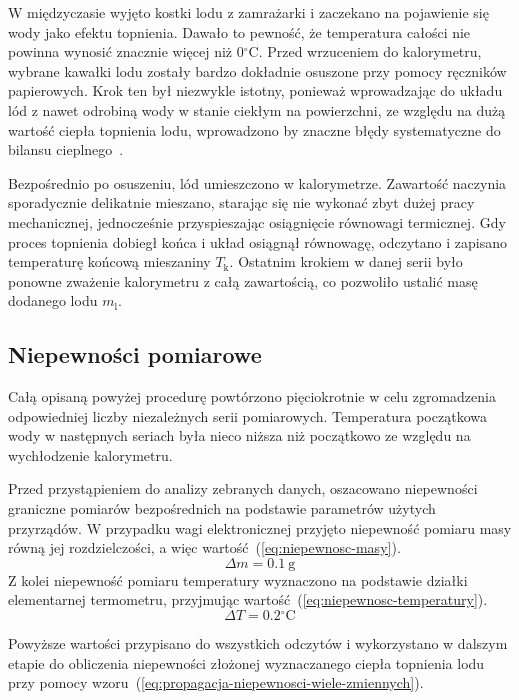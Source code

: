 \documentclass[twocolumn, a4paper, polish, 10pt]{article}
\newcommand{\Tk}{\ensuremath{ T_{\mathrm{k}} }}
\newcommand{\mL}{\ensuremath{ m_{\mathrm{l}} }}
\newcommand{\degCel}{\ensuremath{ \mathrm{^{\circ}C} }}
\begin{document}
W międzyczasie wyjęto kostki lodu z zamrażarki i zaczekano na pojawienie się wody jako efektu topnienia.
Dawało to pewność, że temperatura całości nie powinna wynosić znacznie więcej niż $0\degCel$.
Przed wrzuceniem do kalorymetru, wybrane kawałki lodu zostały bardzo dokładnie osuszone przy pomocy ręczników papierowych.
Krok ten był niezwykle istotny, ponieważ wprowadzając do układu lód z nawet odrobiną wody w stanie ciekłym na powierzchni, ze względu na dużą wartość ciepła topnienia lodu, wprowadzono by znaczne błędy systematyczne do bilansu cieplnego~\cite{pracownia-fizyczna-c4}.

Bezpośrednio po osuszeniu, lód umieszczono w kalorymetrze. Zawartość naczynia sporadycznie delikatnie mieszano, starając się nie wykonać zbyt dużej pracy mechanicznej, jednocześnie przyspieszając osiągnięcie równowagi termicznej.
Gdy proces topnienia dobiegł końca i układ osiągnął równowagę, odczytano i zapisano temperaturę końcową mieszaniny $\Tk$.
Ostatnim krokiem w danej serii było ponowne zważenie kalorymetru z całą zawartością, co pozwoliło ustalić masę dodanego lodu $\mL$.

\subsection{Niepewności pomiarowe}
Całą opisaną powyżej procedurę powtórzono pięciokrotnie w celu zgromadzenia odpowiedniej liczby niezależnych serii pomiarowych. Temperatura początkowa wody w następnych seriach była nieco niższa niż początkowo ze względu na wychłodzenie kalorymetru.

Przed przystąpieniem do analizy zebranych danych, oszacowano niepewności graniczne pomiarów bezpośrednich na podstawie parametrów użytych przyrządów.
W przypadku wagi elektronicznej przyjęto niepewność pomiaru masy równą jej rozdzielczości, a więc wartość~(\ref{eq:niepewnosc-masy}).
\begin{equation}
    \Delta m = 0.1~\mathrm{g}
    \label{eq:niepewnosc-masy}
\end{equation}
Z kolei niepewność pomiaru temperatury wyznaczono na podstawie działki elementarnej termometru, przyjmując wartość~(\ref{eq:niepewnosc-temperatury}).
\begin{equation}
    \Delta T = 0.2\degCel
    \label{eq:niepewnosc-temperatury}
\end{equation}

Powyższe wartości przypisano do wszystkich odczytów i wykorzystano w dalszym etapie do obliczenia niepewności złożonej wyznaczanego ciepła topnienia lodu przy pomocy wzoru~(\ref{eq:propagacja-niepewnosci-wiele-zmiennych}).
\end{document}
